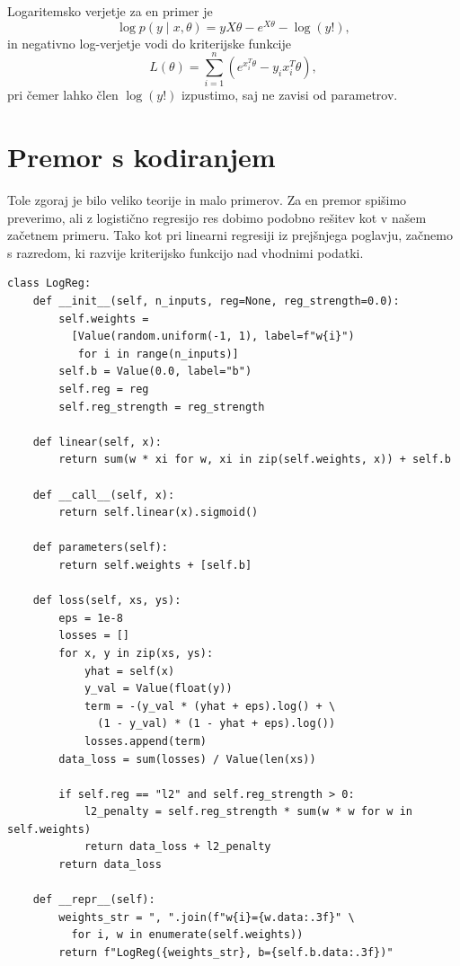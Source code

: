 Logaritemsko verjetje za en primer je
\[
\log p(y \mid x, \theta) = y X\theta - e^{X\theta} - \log(y!),
\]
in negativno log-verjetje vodi do kriterijske funkcije
\[
L(\theta) = \sum_{i=1}^n \left(e^{x_i^T\theta} - y_i x_i^T\theta \right),
\]
pri čemer lahko člen $\log(y!)$ izpustimo, saj ne zavisi od parametrov.

\section{Premor s kodiranjem}

Tole zgoraj je bilo veliko teorije in malo primerov. Za en premor spišimo preverimo, ali z logistično regresijo res dobimo podobno rešitev kot v našem začetnem primeru. Tako kot pri linearni regresiji iz prejšnjega poglavju, začnemo s razredom, ki razvije kriterijsko funkcijo nad vhodnimi podatki.

\vspace*{3mm}
\begin{lstlisting}
class LogReg:
    def __init__(self, n_inputs, reg=None, reg_strength=0.0):
        self.weights = 
          [Value(random.uniform(-1, 1), label=f"w{i}")
           for i in range(n_inputs)]
        self.b = Value(0.0, label="b")
        self.reg = reg
        self.reg_strength = reg_strength

    def linear(self, x):
        return sum(w * xi for w, xi in zip(self.weights, x)) + self.b

    def __call__(self, x):
        return self.linear(x).sigmoid()

    def parameters(self):
        return self.weights + [self.b]

    def loss(self, xs, ys):
        eps = 1e-8
        losses = []
        for x, y in zip(xs, ys):
            yhat = self(x)
            y_val = Value(float(y))
            term = -(y_val * (yhat + eps).log() + \
              (1 - y_val) * (1 - yhat + eps).log())
            losses.append(term)
        data_loss = sum(losses) / Value(len(xs))

        if self.reg == "l2" and self.reg_strength > 0:
            l2_penalty = self.reg_strength * sum(w * w for w in self.weights)
            return data_loss + l2_penalty
        return data_loss

    def __repr__(self):
        weights_str = ", ".join(f"w{i}={w.data:.3f}" \
          for i, w in enumerate(self.weights))
        return f"LogReg({weights_str}, b={self.b.data:.3f})"
\end{lstlisting}

